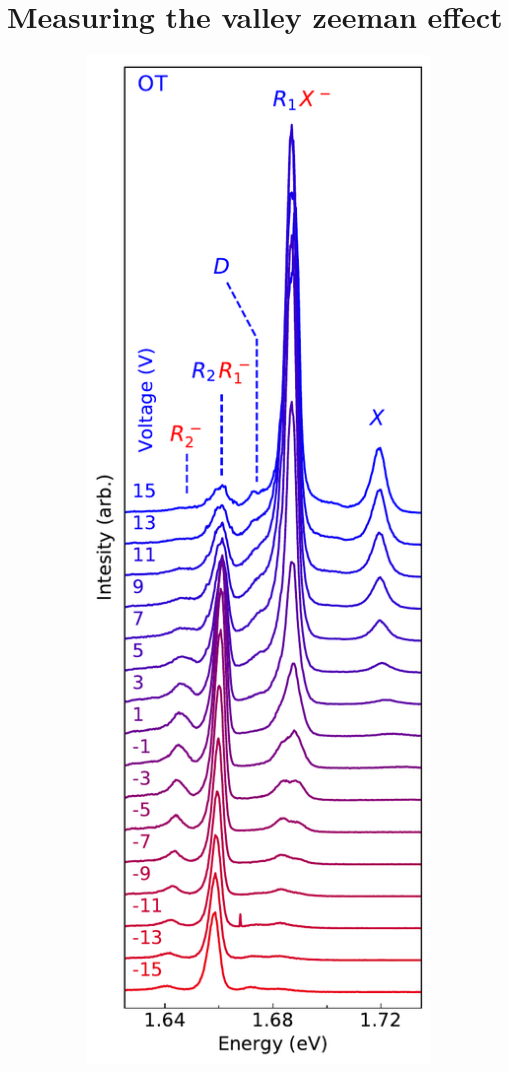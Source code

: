 \section{Measuring the valley zeeman effect}
\begin{figure}[t]
	\begin{subfigure}{0.32\textwidth}
		\caption{}
		\includegraphics[width=\textwidth]{waterfall_0T}

\end{subfigure}
\end{figure}
